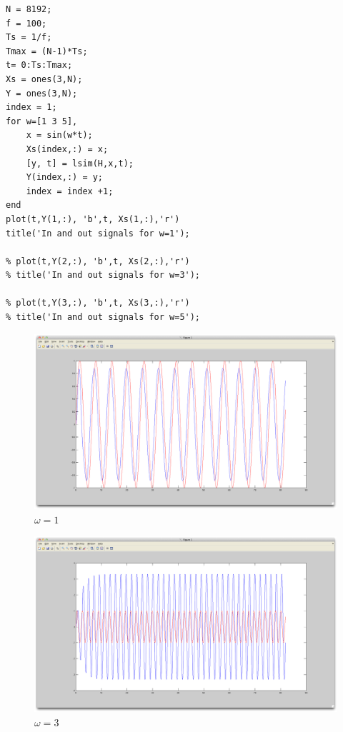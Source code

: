 \documentclass[]{article}
\begin{document}
\begin{verbatim}
N = 8192;
f = 100;
Ts = 1/f;
Tmax = (N-1)*Ts;
t= 0:Ts:Tmax;
Xs = ones(3,N);
Y = ones(3,N);
index = 1;
for w=[1 3 5],
    x = sin(w*t);
    Xs(index,:) = x;
    [y, t] = lsim(H,x,t);
    Y(index,:) = y;
    index = index +1;
end
plot(t,Y(1,:), 'b',t, Xs(1,:),'r')
title('In and out signals for w=1');

% plot(t,Y(2,:), 'b',t, Xs(2,:),'r')
% title('In and out signals for w=3');

% plot(t,Y(3,:), 'b',t, Xs(3,:),'r')
% title('In and out signals for w=5');
\end{verbatim}
\begin{figure}[htb]
  \centering
  \includegraphics[width=15.0cm]{omega 1.png}
  \caption{$\omega = 1$}
\end{figure}
\begin{figure}[htb]
  \centering
  \includegraphics[width=15.0cm]{omega 3.png}
  \caption{$\omega = 3$}
\end{figure}
\end{document}

